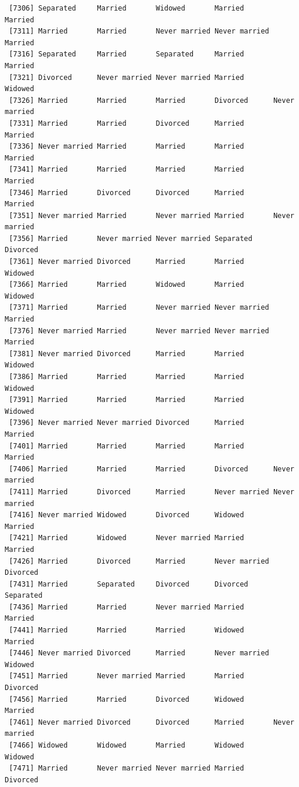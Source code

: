 \documentclass[
  letterpaper,
  DIV=11,
  numbers=noendperiod,
  oneside]{scrartcl}
\begin{document}
\begin{verbatim}
 [7306] Separated     Married       Widowed       Married       Married      
 [7311] Married       Married       Never married Never married Married      
 [7316] Separated     Married       Separated     Married       Married      
 [7321] Divorced      Never married Never married Married       Widowed      
 [7326] Married       Married       Married       Divorced      Never married
 [7331] Married       Married       Divorced      Married       Married      
 [7336] Never married Married       Married       Married       Married      
 [7341] Married       Married       Married       Married       Married      
 [7346] Married       Divorced      Divorced      Married       Married      
 [7351] Never married Married       Never married Married       Never married
 [7356] Married       Never married Never married Separated     Divorced     
 [7361] Never married Divorced      Married       Married       Widowed      
 [7366] Married       Married       Widowed       Married       Widowed      
 [7371] Married       Married       Never married Never married Married      
 [7376] Never married Married       Never married Never married Married      
 [7381] Never married Divorced      Married       Married       Widowed      
 [7386] Married       Married       Married       Married       Widowed      
 [7391] Married       Married       Married       Married       Widowed      
 [7396] Never married Never married Divorced      Married       Married      
 [7401] Married       Married       Married       Married       Married      
 [7406] Married       Married       Married       Divorced      Never married
 [7411] Married       Divorced      Married       Never married Never married
 [7416] Never married Widowed       Divorced      Widowed       Married      
 [7421] Married       Widowed       Never married Married       Married      
 [7426] Married       Divorced      Married       Never married Divorced     
 [7431] Married       Separated     Divorced      Divorced      Separated    
 [7436] Married       Married       Never married Married       Married      
 [7441] Married       Married       Married       Widowed       Married      
 [7446] Never married Divorced      Married       Never married Widowed      
 [7451] Married       Never married Married       Married       Divorced     
 [7456] Married       Married       Divorced      Widowed       Married      
 [7461] Never married Divorced      Divorced      Married       Never married
 [7466] Widowed       Widowed       Married       Widowed       Widowed      
 [7471] Married       Never married Never married Married       Divorced     

\end{verbatim}
\end{document}
